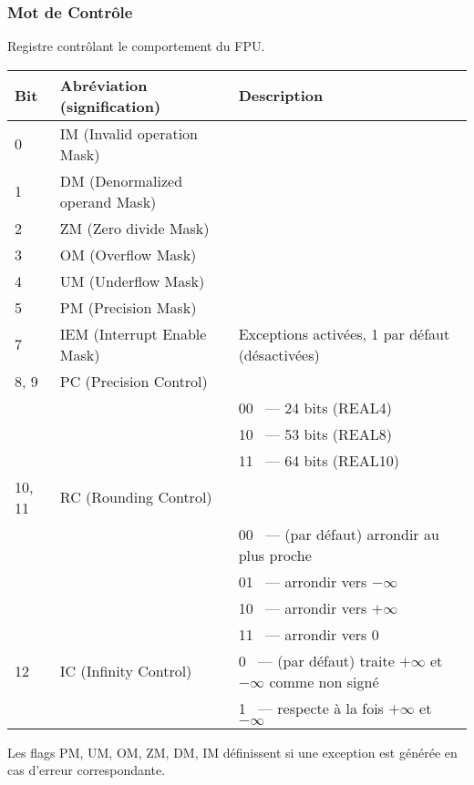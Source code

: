\label{FPU_control_word}
\subsubsection{Mot de Contrôle}

Registre contrôlant le comportement du
\ac{FPU}.

\small
\begin{center}
\begin{tabular}{ | l | l | l | }
\hline
Bit &
Abréviation (signification) &
Description \\
\hline
0   & IM (Invalid operation Mask) & \\
\hline
1   & DM (Denormalized operand Mask) & \\
\hline
2   & ZM (Zero divide Mask) & \\
\hline
3   & OM (Overflow Mask) & \\
\hline
4   & UM (Underflow Mask) & \\
\hline
5   & PM (Precision Mask) & \\
\hline
7   & IEM (Interrupt Enable Mask) & Exceptions activées, 1 par défaut (désactivées) \\
\hline
8, 9 & PC (Precision Control) &  \\
     &                        & 00 ~--- 24 bits (REAL4) \\
     &                        & 10 ~--- 53 bits (REAL8) \\
     &                        & 11 ~--- 64 bits (REAL10) \\
\hline
10, 11 & RC (Rounding Control) &  \\
       &                       & 00 ~--- (par défaut) arrondir au plus proche \\
       &                       & 01 ~--- arrondir vers $-\infty$ \\
       &                       & 10 ~--- arrondir vers $+\infty$ \\
       &                       & 11 ~--- arrondir vers 0 \\
\hline
12 & IC (Infinity Control) & 0 ~--- (par défaut) traite $+\infty$ et $-\infty$ comme non signé \\
   &                       & 1 ~--- respecte à la fois $+\infty$ et $-\infty$ \\
\hline
\end{tabular}
\end{center}
\normalsize

Les flags PM, UM, OM, ZM, DM, IM 
définissent si une exception est générée en cas d'erreur correspondante.


